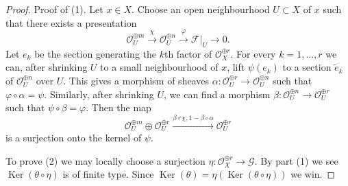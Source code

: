 \documentclass[10pt,a4paper]{amsart}
\theoremstyle{plain}
\theoremstyle{definition}
\theoremstyle{remark}
\numberwithin{equation}{subsection}
\def\Ker{\mathop{\mathrm{Ker}}}
\begin{document}
\begin{proof}
Proof of (1).
Let $x \in X$. Choose an open neighbourhood $U \subset X$ of $x$
such that there exists a presentation
$$
\mathcal{O}_U^{\oplus m}
\xrightarrow{\chi}
\mathcal{O}_U^{\oplus n}
\xrightarrow{\varphi}
\mathcal{F}|_U
\to
0.
$$
Let $e_k$ be the section generating the $k$th factor of
$\mathcal{O}_X^{\oplus r}$. For every $k = 1, \ldots, r$
we can, after shrinking $U$ to a small neighbourhood of $x$,
lift $\psi(e_k)$ to a section $\tilde e_k$ of
$\mathcal{O}_U^{\oplus n}$ over $U$. This gives a morphism
of sheaves $\alpha : \mathcal{O}_U^{\oplus r} \to \mathcal{O}_U^{\oplus n}$
such that $\varphi \circ \alpha = \psi$.
Similarly, after shrinking $U$, we can find a morphism
$\beta : \mathcal{O}_U^{\oplus n} \to \mathcal{O}_U^{\oplus r}$
such that $\psi \circ \beta = \varphi$. Then the map
$$
\mathcal{O}_U^{\oplus m} \oplus
\mathcal{O}_U^{\oplus r}
\xrightarrow{\beta \circ \chi, 1 - \beta \circ \alpha}
\mathcal{O}_U^{\oplus r}
$$
is a surjection onto the kernel of $\psi$.

\medskip\noindent
To prove (2) we may locally choose a surjection
$\eta : \mathcal{O}_X^{\oplus r} \to \mathcal{G}$.
By part (1) we see $\Ker(\theta \circ \eta)$ is of finite type.
Since $\Ker(\theta) = \eta(\Ker(\theta \circ \eta))$ we win.
\end{proof}
\end{document}
